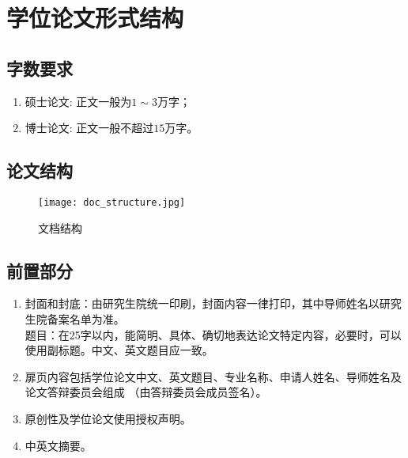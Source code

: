 
\chapter{学位论文形式结构}

\section{字数要求}
\begin{enumerate}
    \item 硕士论文: 正文一般为$1 \sim 3$万字；
    \item 博士论文: 正文一般不超过$15$万字。
\end{enumerate}

\section{论文结构}
\begin{figure}
    \centering
    \texttt{[image: doc\_structure.jpg]}
    \caption{文档结构}
\end{figure}

\section{前置部分}


\begin{enumerate}
    \item 封面和封底：由研究生院统一印刷，封面内容一律打印，其中导师姓名以研究生院备案名单为准。\\
          题目：在25字以内，能简明、具体、确切地表达论文特定内容，必要时，可以使用副标题。中文、英文题目应一致。
      \item 扉页内容包括学位论文中文、英文题目、专业名称、申请人姓名、导师姓名及论文答辩委员会组成 （由答辩委员会成员签名）。
      \item 原创性及学位论文使用授权声明。
      \item 中英文摘要。
\end{enumerate}


